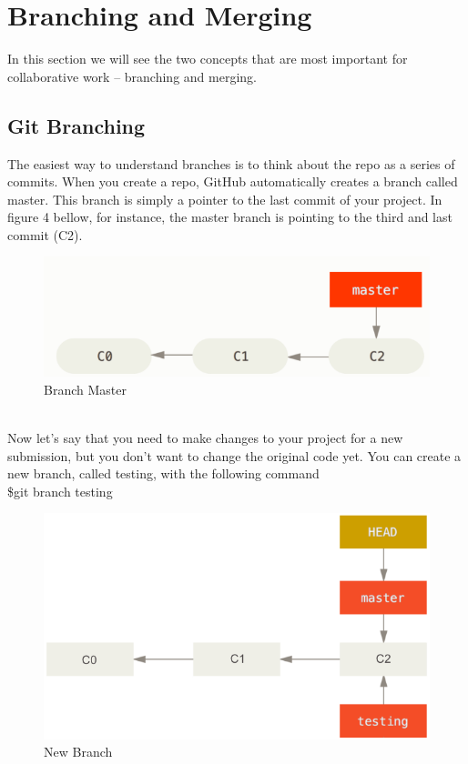 \documentclass{article}
\begin{document}
    \section{Branching and Merging}
    In this section we will see the two concepts that are most important for collaborative work -- branching and merging.
    \subsection{Git Branching}
    \label{sec:branching}
    The easiest way to understand branches is to think about the repo as a series of commits. When you create a repo, GitHub automatically creates a branch called master. This branch is simply a pointer to the last commit of your project. In figure 4 bellow, for instance, the master branch is pointing to the third and last commit (C2).
    \begin{figure}[H]
    	\caption{Branch Master}
    	\includegraphics[scale=0.5]{images/figure4.png}
    	\centering
    \end{figure}
    \leavevmode \\
    Now let's say that you need to make changes to your project for a new submission, but you don't want to change the original code yet. You  can create a new branch, called testing, with the following command \\
    \newline
    \indent \$git branch testing \\
    \begin{figure}[H]
    	\caption{New Branch}
    	\includegraphics[scale=0.5]{images/figure5.png}
    	\centering
    \end{figure} 
\end{document}
